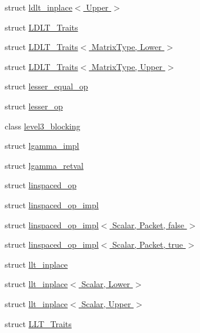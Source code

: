 \begin{DoxyCompactItemize}
\item 
struct \hyperlink{struct_eigen_1_1internal_1_1ldlt__inplace_3_01_upper_01_4}{ldlt\+\_\+inplace$<$ Upper $>$}
\item 
struct \hyperlink{struct_eigen_1_1internal_1_1_l_d_l_t___traits}{L\+D\+L\+T\+\_\+\+Traits}
\item 
struct \hyperlink{struct_eigen_1_1internal_1_1_l_d_l_t___traits_3_01_matrix_type_00_01_lower_01_4}{L\+D\+L\+T\+\_\+\+Traits$<$ Matrix\+Type, Lower $>$}
\item 
struct \hyperlink{struct_eigen_1_1internal_1_1_l_d_l_t___traits_3_01_matrix_type_00_01_upper_01_4}{L\+D\+L\+T\+\_\+\+Traits$<$ Matrix\+Type, Upper $>$}
\item 
struct \hyperlink{struct_eigen_1_1internal_1_1lesser__equal__op}{lesser\+\_\+equal\+\_\+op}
\item 
struct \hyperlink{struct_eigen_1_1internal_1_1lesser__op}{lesser\+\_\+op}
\item 
class \hyperlink{class_eigen_1_1internal_1_1level3__blocking}{level3\+\_\+blocking}
\item 
struct \hyperlink{struct_eigen_1_1internal_1_1lgamma__impl}{lgamma\+\_\+impl}
\item 
struct \hyperlink{struct_eigen_1_1internal_1_1lgamma__retval}{lgamma\+\_\+retval}
\item 
struct \hyperlink{struct_eigen_1_1internal_1_1linspaced__op}{linspaced\+\_\+op}
\item 
struct \hyperlink{struct_eigen_1_1internal_1_1linspaced__op__impl}{linspaced\+\_\+op\+\_\+impl}
\item 
struct \hyperlink{struct_eigen_1_1internal_1_1linspaced__op__impl_3_01_scalar_00_01_packet_00_01false_01_4}{linspaced\+\_\+op\+\_\+impl$<$ Scalar, Packet, false $>$}
\item 
struct \hyperlink{struct_eigen_1_1internal_1_1linspaced__op__impl_3_01_scalar_00_01_packet_00_01true_01_4}{linspaced\+\_\+op\+\_\+impl$<$ Scalar, Packet, true $>$}
\item 
struct \hyperlink{struct_eigen_1_1internal_1_1llt__inplace}{llt\+\_\+inplace}
\item 
struct \hyperlink{struct_eigen_1_1internal_1_1llt__inplace_3_01_scalar_00_01_lower_01_4}{llt\+\_\+inplace$<$ Scalar, Lower $>$}
\item 
struct \hyperlink{struct_eigen_1_1internal_1_1llt__inplace_3_01_scalar_00_01_upper_01_4}{llt\+\_\+inplace$<$ Scalar, Upper $>$}
\item 
struct \hyperlink{struct_eigen_1_1internal_1_1_l_l_t___traits}{L\+L\+T\+\_\+\+Traits}

\end{DoxyCompactItemize}
